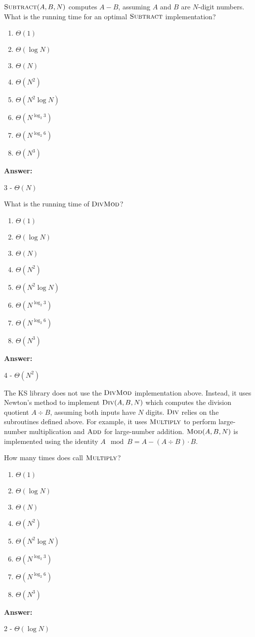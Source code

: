 \documentclass[12pt,twoside]{article}
\newcommand{\answer}{
 \par\medskip
 \textbf{Answer:}
}
\newcommand{\answerIh}{ \answer
3 - $\Theta(N)$
}
\newcommand{\answerIi}{ \answer
4 - $\Theta(N^2)$
}
\newcommand{\answerIj}{ \answer
2 - $\Theta(\log N)$
}
\begin{document}
\begin{problems}
\begin{problemparts}
\problempart {} $\textnormal{\scshape Subtract}(A, B, N)$ computes $A - B$, assuming
$A$ and $B$ are $N$-digit numbers. What is the running time for an optimal
$\textnormal{\scshape Subtract}$ implementation?
\begin{enumerate}
  \item $\Theta(1)$
  \item $\Theta(\log N)$
  \item $\Theta(N)$
  \item $\Theta(N^2)$
  \item $\Theta(N^2 \log N)$
  \item $\Theta(N^{\log_2 3})$
  \item $\Theta(N^{\log_2 6})$
  \item $\Theta(N^3)$
\end{enumerate}
\answerIh

\problempart {} What is the running time of $\textnormal{\scshape DivMod}$?
\begin{enumerate}
  \item $\Theta(1)$
  \item $\Theta(\log N)$
  \item $\Theta(N)$
  \item $\Theta(N^2)$
  \item $\Theta(N^2 \log N)$
  \item $\Theta(N^{\log_2 3})$
  \item $\Theta(N^{\log_2 6})$
  \item $\Theta(N^3)$
\end{enumerate}
\answerIi

\end{problemparts}

The KS library does not use the $\textnormal{\scshape DivMod}$ implementation above. Instead,
it uses Newton's method to implement $\textnormal{\scshape Div}(A, B, N)$ which computes the
division quotient $A \div B$, assuming both inputs have $N$ digits. $\textnormal{\scshape Div}$
relies on the subroutines defined above. For example, it uses $\textnormal{\scshape Multiply}$
to perform large-number multiplication and $\textnormal{\scshape Add}$ for large-number
addition. $\textnormal{\scshape Mod}(A, B, N)$ is implemented using the identity $A \mod B = A
- (A \div B) \cdot B$.

\begin{problemparts}

\problempart {} How many times does  call $\textnormal{\scshape Multiply}$?
\begin{enumerate}
  \item $\Theta(1)$
  \item $\Theta(\log N)$
  \item $\Theta(N)$
  \item $\Theta(N^2)$
  \item $\Theta(N^2 \log N)$
  \item $\Theta(N^{\log_2 3})$
  \item $\Theta(N^{\log_2 6})$
  \item $\Theta(N^3)$
\end{enumerate}
\answerIj


\end{problemparts}
\end{problems}
\end{document}
